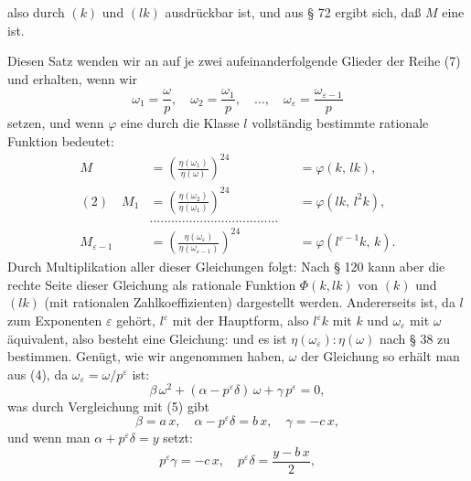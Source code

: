 
also  durch $(k)$ und $(lk)$ ausdrückbar ist, und aus § 72
ergibt sich, daß $M$ eine  ist.

Diesen Satz wenden wir an auf je zwei aufeinanderfolgende
Glieder der Reihe (7) und erhalten, wenn wir %
\[
\omega_1 = \frac{\omega}{p}, \quad \omega_2 = \frac{\omega_1}{p}, \quad \dotsc, \quad \omega_\varepsilon = \frac{\omega_{\varepsilon-1}}{p}
\]
setzen, und wenn $\varphi$ eine durch die Klasse $l$ vollständig bestimmte
rationale Funktion bedeutet:
\[
\begin{aligned}
M &= \left(\frac{\eta(\omega_1)}{\eta(\omega)}\right)^{24} &&= \varphi(k,\, lk), \\
(2)\quad M_1 &= \left(\frac{\eta(\omega_2)}{\eta(\omega_1)}\right)^{24} &&= \varphi(lk,\, l^2k), \\
&\dotsc\dotsc\dotsc\dotsc\dotsc\dotsc\dotsc\dotsc\dotsc\dotsc\dotsc\dotsc \\
M_{\varepsilon-1} &= \left(\frac{\eta(\omega_\varepsilon)}{\eta(\omega_{\varepsilon-1})}\right)^{24} &&= \varphi(l^{\varepsilon-1}k,\, k).
\end{aligned}
\]
Durch Multiplikation aller dieser Gleichungen folgt:
Nach § 120 kann aber die rechte Seite dieser Gleichung als
rationale Funktion $\Phi(k, lk)$ von $(k)$ und $(lk)$ (mit rationalen Zahlkoeffizienten)
dargestellt werden.
Andererseits ist, da $l$ zum Exponenten $\varepsilon$ gehört, $l^\varepsilon$ mit der
Hauptform, also $l^\varepsilon k$ mit $k$ und $\omega_\varepsilon$ mit $\omega$ äquivalent, also besteht
eine Gleichung:
und es ist $\eta(\omega_\varepsilon) : \eta(\omega)$ nach § 38 zu bestimmen. Genügt, wie
wir angenommen haben, $\omega$ der Gleichung
so erhält man aus (4), da $\omega_\varepsilon = \omega/p^\varepsilon$ ist:
\[
\beta\,\omega^2 + (\alpha - p^\varepsilon\delta)\,\omega + \gamma\,p^\varepsilon = 0,
\]
was durch Vergleichung mit (5) gibt
\[
\beta = a\,x, \quad \alpha - p^\varepsilon\delta = b\,x, \quad \gamma = -c\,x,
\]
und wenn man $\alpha + p^\varepsilon\delta = y$ setzt:
\[
p^\varepsilon\gamma = -c\,x, \quad p^\varepsilon\delta = \frac{y - b\,x}{2},
\]

